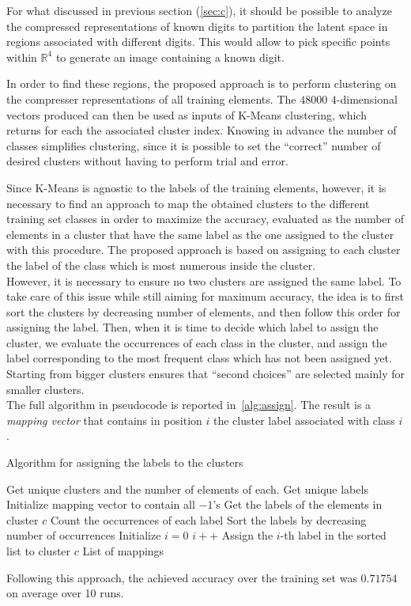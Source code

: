 \documentclass[12pt]{article}
\begin{document}
For what discussed in previous section (\ref{sec:c}), it should be possible to analyze the compressed representations of known digits to partition the latent space in regions associated with different digits.
This would allow to pick specific points within $\mathbb{R}^4$ to generate an image containing a known digit.

In order to find these regions, the proposed approach is to perform clustering on the compresser representations of all training elements.
The $48000$ $4$-dimensional vectors produced can then be used as inputs of K-Means clustering, which returns for each the associated cluster index.
Knowing in advance the number of classes simplifies clustering, since it is possible to set the ``correct'' number of desired clusters without having to perform trial and error.

Since K-Means is agnostic to the labels of the training elements, however, it is necessary to find an approach to map the obtained clusters to the different training set classes in order to maximize the accuracy, evaluated as the number of elements in a cluster that have the same label as the one assigned to the cluster with this procedure.
The proposed approach is based on assigning to each cluster the label of the class which is most numerous inside the cluster.\\
However, it is necessary to ensure no two clusters are assigned the same label.
To take care of this issue while still aiming for maximum accuracy, the idea is to first sort the clusters by decreasing number of elements, and then follow this order for assigning the label.
Then, when it is time to decide which label to assign the cluster, we evaluate the occurrences of each class in the cluster, and assign the label corresponding to the most frequent class which has not been assigned yet.
Starting from bigger clusters ensures that ``second choices'' are selected mainly for smaller clusters.\\
The full algorithm in pseudocode is reported in\ \ref{alg:assign}.
The result is a \textit{mapping vector} that contains in position $i$ the cluster label associated with class $i$.

\begin{algorithm}
  \caption{Algorithm for assigning the labels to the clusters}\label{alg:assign}
  \begin{algorithmic}
    \State Get unique clusters and the number of elements of each.
    \State Get unique labels
    \State Initialize mapping vector to contain all $-1$'s
      \State Get the labels of the elements in cluster $c$
      \State Count the occurrences of each label
      \State Sort the labels by decreasing number of occurrences
      \State Initialize $i = 0$
        \State $i++$
      \EndWhile
      \State Assign the $i$-th label in the sorted list to cluster $c$
    \EndFor
    \State
    \Return List of mappings
  \end{algorithmic}
\end{algorithm}

Following this approach, the achieved accuracy over the training set was $0.71754$ on average over 10 runs.
\end{document}
